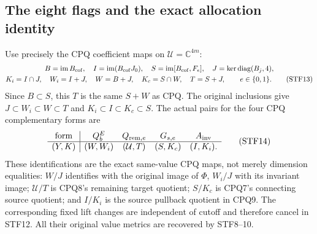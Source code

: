 \subsection{The eight flags and the exact allocation identity}
Use precisely the CPQ coefficient maps on $\mathcal U=\mathbb C^{4m}$:
\[
 \begin{gathered}
 B=\operatorname{im}B_{\rm cof},\quad
 I=\operatorname{im}(B_{\rm cof}J_0),\quad
 S=\operatorname{im}[B_{\rm cof},F_e],\quad
 J=\ker\operatorname{diag}(B_j,4),\\
 K_i=I\cap J,\quad W_i=I+J,\quad W=B+J,\quad
 K_c=S\cap W,\quad T=S+J,
 \qquad e\in\{0,1\}.                                    \tag{STF13}
 \end{gathered}
\]
Since $B\subset S$, this $T$ is the same $S+W$ as CPQ.
The original inclusions give
$J\subset W_i\subset W\subset T$ and
$K_i\subset I\subset K_c\subset S$.
The actual pairs for the four CPQ complementary forms are
\[
 \begin{array}{c|cccc}
 \text{form}&Q_b^E&Q_{{\rm rem},e}&G_{s,e}&A_{\rm inv}\\ \hline
 (Y,K)&(W,W_i)&(\mathcal U,T)&(S,K_c)&(I,K_i).
 \end{array}                                                   \tag{STF14}
\]
These identifications are the exact same-value CPQ maps, not merely
dimension equalities: $W/J$ identifies with the original image of
$\Phi$, $W_i/J$ with its invariant image; $\mathcal U/T$ is CPQ8's
remaining target quotient; $S/K_c$ is CPQ7's connecting source quotient;
and $I/K_i$ is the source pullback quotient in CPQ9. The corresponding
fixed lift changes are independent of cutoff and therefore cancel in
STF12. All their original value metrics are recovered by STF8--10.

